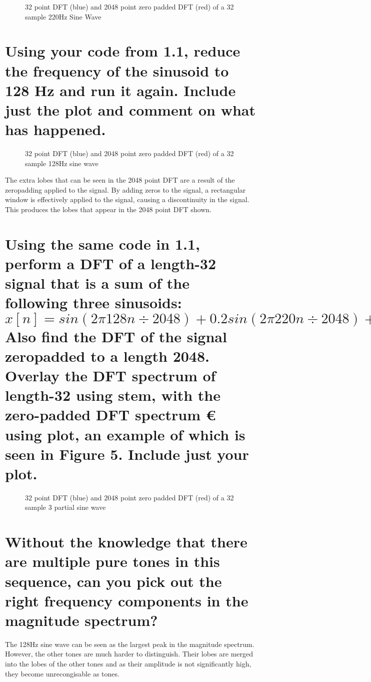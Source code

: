 \documentclass[titlepage]{scrartcl}
\begin{document}
\begin{figure}[H]
    \caption{32 point DFT (blue) and 2048 point zero padded DFT (red) of a
    32 sample 220Hz Sine Wave}
    \label{ZeropadDFT1}
\end{figure}

\section{Using your code from 1.1, reduce the frequency of the sinusoid to 128
Hz and run it again. Include just the plot and comment on what has happened.}
\begin{figure}[H]
    \caption{32 point DFT (blue) and 2048 point zero padded DFT (red) of a 32
    sample 128Hz sine wave}
    \label{ZeropadDFT2}
\end{figure}

The extra lobes that can be seen in the 2048 point DFT are a result of the
zeropadding applied to the signal. By adding zeros to the signal, a rectangular
window is effectively applied to the signal, causing a discontinuity in the
signal. This produces the lobes that appear in the 2048 point DFT shown.
\pagebreak
\section{Using the same code in 1.1, perform a DFT of a length-32 signal that
    is a sum of the following three
    sinusoids:
    $$x[n]=sin(2\pi128n\div2048)+0.2sin(2\pi220n\div2048)+0.01cos(2\pi525n\div2048)$$
    Also find the DFT of the signal zeropadded to a length 2048. Overlay
    the
DFT spectrum of length-32 using stem, with the zero-padded DFT
    spectrum
€
using plot, an example of which is seen in Figure 5. Include
just your plot.}
\begin{figure}[H]
    \caption{32 point DFT (blue) and 2048 point zero padded DFT (red) of a 32
    sample 3 partial sine wave}
    \label{ZeropadDFT3}
\end{figure}

\section{Without the knowledge that there are multiple pure tones in this
sequence, can you pick out the right frequency components in the magnitude
spectrum?}
The 128Hz sine wave can be seen as the largest peak in the magnitude spectrum.
However, the other tones are much harder to distinguish. Their lobes are merged
into the lobes of the other tones and as their amplitude is not significantly
high, they become unrecongisable as tones.
\end{document}
